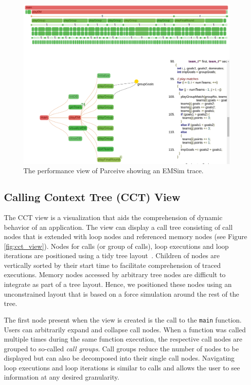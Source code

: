 \begin{figure}[ht!]
	\begin{center}
		\includegraphics[clip, trim=0.1cm 16.0cm 0.1cm 0.1cm,
width=\linewidth]{img/performance_view.pdf}
		\caption{The performance view of Parceive showing an EMSim trace.}
		\label{fig:emsim}
	\end{center}
\end{figure}

\subsection{Calling Context Tree (CCT) View}
The CCT view is a visualization that aids the comprehension of dynamic behavior
of an application. The view can display a call tree consisting of call nodes
that is extended with loop nodes and referenced memory nodes (see Figure
\ref{fig:cct_view}). Nodes for calls (or group of calls), loop executions and
loop iterations are positioned using a tidy tree layout~\cite{TidierTree}.
Children of nodes are vertically sorted by their start time to facilitate
comprehension of traced executions. Memory nodes accessed by arbitrary tree
nodes are difficult to integrate as part of a tree layout. Hence, we positioned
these nodes using an unconstrained layout that is based on a force simulation
around the rest of the tree.

The first node present when the view is created is the call to the
\texttt{main} function. Users can arbitrarily expand and collapse call nodes.
When a function was called multiple times during the same function execution,
the respective call nodes are grouped to so-called \textit{call groups}. Call
groups reduce the number of nodes to be displayed but can also be decomposed
into their single call nodes. Navigating loop executions and loop iterations is
similar to calls and allows the user to see information at any desired
granularity. 

